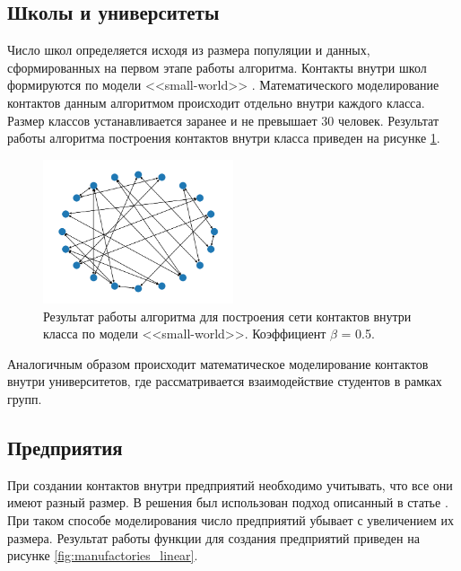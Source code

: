 \documentclass[14pt,a4paper]{article}
\begin{document}
\subsection{Школы и университеты}

Число школ определяется исходя из размера популяции и данных, сформированных на первом этапе работы алгоритма. Контакты внутри школ формируются по модели <<small-world>> \cite{Watts}. Математического моделирование контактов данным алгоритмом происходит отдельно внутри каждого класса. Размер классов устанавливается заранее и не превышает 30 человек. Результат работы алгоритма построения контактов внутри класса приведен на рисунке \ref{fig:graph_connections}.

\begin{figure}[h!]
	\centering
	\includegraphics[width=0.5\textwidth]{img/graph_connections.png}
	\caption{Результат работы алгоритма для построения сети контактов внутри класса по модели <<small-world>>. Коэффициент $\beta$ = 0.5.}
	\label{fig:graph_connections}
\end{figure}

Аналогичным образом происходит математическое моделирование контактов внутри университетов, где рассматривается взаимодействие студентов в рамках групп. 


\subsection{Предприятия}

При создании контактов внутри предприятий необходимо учитывать, что все они имеют разный размер. В решения был использован подход описанный в статье \cite{Axtell}. При таком способе моделирования число предприятий убывает с увеличением их размера. Результат работы функции для создания предприятий приведен на рисунке \ref{fig:manufactories_linear}.
\end{document}
